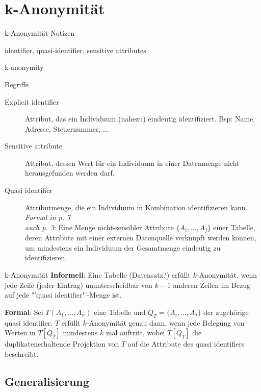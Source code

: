 \section{k-Anonymität}

\begin{frame}{k-Anonymität}
Notizen

identifier, quasi-identifier, sensitive attributes

k-anonymity
\end{frame}

\begin{frame}{Begriffe}
	\begin{description}
	\item[Explicit identifier] Attribut, das ein Individuum (nahezu) eindeutig identifiziert. Bsp: Name, Adresse, Steuernummer, ...
	
	\item[Sensitive attribute] Attribut, dessen Wert für ein Individuum in einer Datenmenge nicht herausgefunden werden darf.
	
	\item[Quasi identifier] Attributmenge, die ein Individuum in Kombination identifizieren kann. \textit{Formal in \cite{sweeney_k_anonymity} p. 7} \\
	\textit{auch \cite{machanavajjhala_l_diversity} p. 3}: Eine Menge nicht-sensibler Attribute \(\{A_i, \dots, A_j\}\) einer Tabelle, deren Attribute mit einer externen Datenquelle verknüpft werden können, um mindestens ein Individuum der Gesamtmenge eindeutig zu identifizieren.
	\end{description}
\end{frame}

\begin{frame}{k-Anonymität}
	\textbf{Informell}: Eine Tabelle (Datensatz?) erfüllt \(k\)-Anonymität, wenn jede Zeile (jeder Eintrag) ununterscheidbar von \(k-1\) anderen Zeilen im Bezug auf jede "'quasi identifier"'-Menge ist.

	\vspace{0.5cm}

	\textbf{Formal}: Sei \(T(A_1, \dots , A_n)\) eine Tabelle und \(Q_T=\{A_i, \dots, A_j\}\) der zugehörige quasi identifier. \(T\) erfüllt \(k\)-Anonymität genau dann, wenn jede Belegung von Werten in \(T[Q_T]\) mindestens \(k\) mal auftritt, wobei \(T[Q_T]\) die duplikatenerhaltende Projektion von \(T\) auf die Attribute des quasi identifiers beschreibt.
\end{frame}

\subsection{Generalisierung}

